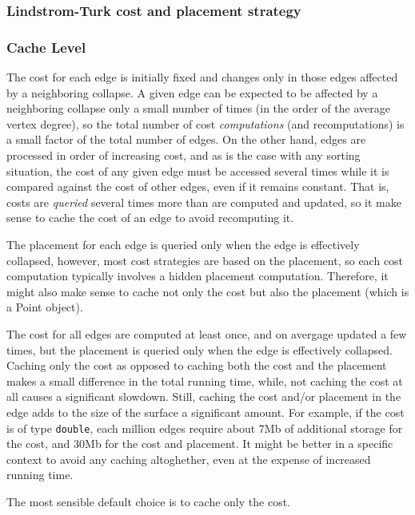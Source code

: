 \subsubsection{Lindstrom-Turk cost and placement strategy\label{SurfaceMeshSimplification:LindstromTurkStrategy}}

\subsubsection{Cache Level}

The cost for each edge is initially fixed and changes only in those edges 
affected by a neighboring collapse. A given edge can be expected to be 
affected by a neighboring collapse only a small number of times 
(in the order of the average vertex degree), so the total number of 
cost {\em computations} (and recomputations) is a small factor of
the total number of edges. 
On the other hand, edges are processed in order of increasing cost, and as is 
the case with any sorting situation, the cost of any given edge must be accessed 
several times while it is compared against the cost of other edges, even if it 
remains constant. That is, costs are {\em queried} several times more than are computed 
and updated, so it make sense to cache the cost of an edge to avoid recomputing it.

The placement for each edge is queried only when the edge is effectively collapsed, 
however, most cost strategies are based on the placement, so each cost computation 
typically involves a hidden placement computation. Therefore, it might also make sense
to cache not only the cost but also the placement (which is a Point object).

The cost for all edges are computed at least once, and on avergage updated a few times,
but the placement is queried only when the edge is effectively collapsed. Caching only
the cost as opposed to caching both the cost and the placement makes a small difference
in the total running time, while, not caching the cost at all causes a significant slowdown.
Still, caching the cost and/or placement in the edge adds to the size of the surface 
a significant amount. For example, if the cost is of type {\tt double}, each million edges
require about 7Mb of additional storage for the cost, and 30Mb for the cost and placement.
It might be better in a specific context to avoid any caching altoghether, even 
at the expense of increased running time.

The most sensible default choice is to cache only the cost.

